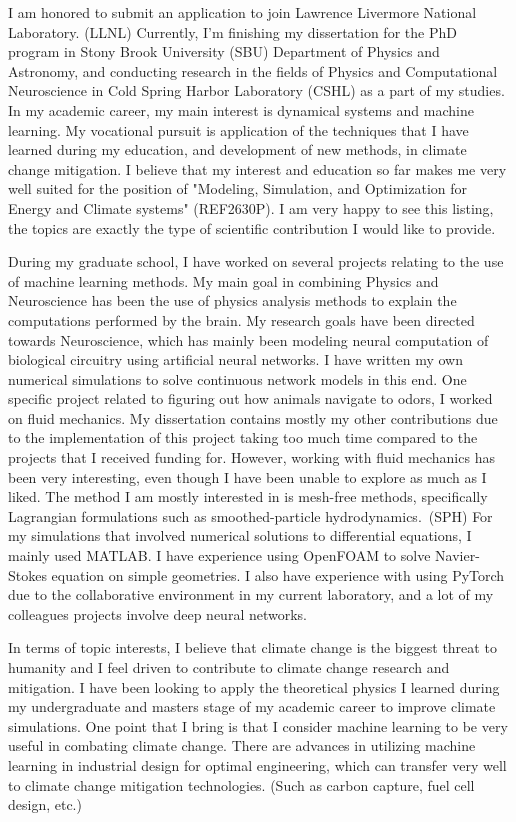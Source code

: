 I am honored to submit an application to join Lawrence Livermore National Laboratory. (LLNL)
Currently, I'm finishing my dissertation for the PhD program in Stony Brook University (SBU) Department of Physics and Astronomy, and conducting research in the fields of Physics and Computational Neuroscience in Cold Spring Harbor Laboratory (CSHL) as a part of my studies.
In my academic career, my main interest is dynamical systems and machine learning.
My vocational pursuit is application of the techniques that I have learned during my education, and development of new methods, in climate change mitigation.
I believe that my interest and education so far makes me very well suited for the position of "Modeling, Simulation, and Optimization for Energy and Climate systems" (REF2630P).
I am very happy to see this listing, the topics are exactly the type of scientific contribution I would like to provide.

During my graduate school, I have worked on several projects relating to the use of machine learning methods.
My main goal in combining Physics and Neuroscience has been the use of physics analysis methods to explain the computations performed by the brain.
My research goals have been directed towards Neuroscience, which has mainly been modeling neural computation of biological circuitry using artificial neural networks.
I have written my own numerical simulations to solve continuous network models in this end.
One specific project related to figuring out how animals navigate to odors, I worked on fluid mechanics.
My dissertation contains mostly my other contributions due to the implementation of this project taking too much time compared to the projects that I received funding for.
However, working with fluid mechanics has been very interesting, even though I have been unable to explore as much as I liked.
The method I am mostly interested in is mesh-free methods, specifically Lagrangian formulations such as smoothed-particle hydrodynamics.~(SPH)
For my simulations that involved numerical solutions to differential equations, I mainly used MATLAB.
I have experience using OpenFOAM to solve Navier-Stokes equation on simple geometries.
I also have experience with using PyTorch due to the collaborative environment in my current laboratory, and a lot of my colleagues projects involve deep neural networks.

In terms of topic interests, I believe that climate change is the biggest threat to humanity and I feel driven to contribute to climate change research and mitigation.
I have been looking to apply the theoretical physics I learned during my undergraduate and masters stage of my academic career to improve climate simulations.
One point that I bring is that I consider machine learning to be very useful in combating climate change.
There are advances in utilizing machine learning in industrial design for optimal engineering, which can transfer very well to climate change mitigation technologies.
(Such as carbon capture, fuel cell design, etc.)

